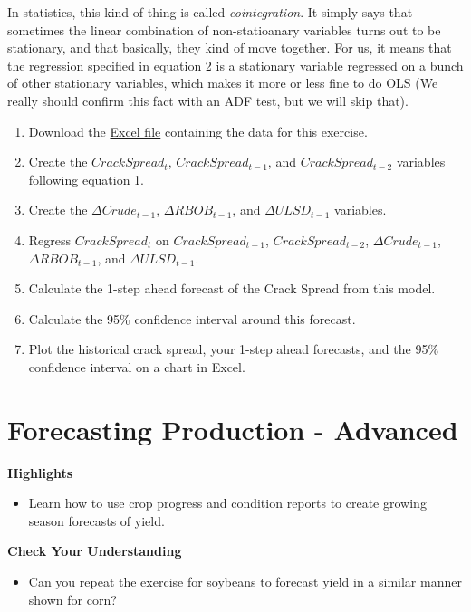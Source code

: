 \documentclass[
]{book}
\providecommand{\tightlist}{%
  \setlength{\itemsep}{0pt}\setlength{\parskip}{0pt}}
\begin{document}
In statistics, this kind of thing is called \emph{cointegration}. It simply says that sometimes the linear combination of non-statioanary variables turns out to be stationary, and that basically, they kind of move together. For us, it means that the regression specified in equation 2 is a stationary variable regressed on a bunch of other stationary variables, which makes it more or less fine to do OLS (We really should confirm this fact with an ADF test, but we will skip that).

\begin{enumerate}
\def\labelenumi{\arabic{enumi}.}
\item
  Download the \href{Excel-files/CrackSpread.csv}{Excel file} containing the data for this exercise.
\item
  Create the \(CrackSpread_t\), \(CrackSpread_{t-1}\), and \(CrackSpread_{t-2}\) variables following equation 1.
\item
  Create the \(\Delta Crude_{t-1}\), \(\Delta RBOB_{t-1}\), and \(\Delta ULSD_{t-1}\) variables.
\item
  Regress \(CrackSpread_t\) on \(CrackSpread_{t-1}\), \(CrackSpread_{t-2}\), \(\Delta Crude_{t-1}\), \(\Delta RBOB_{t-1}\), and \(\Delta ULSD_{t-1}\).
\item
  Calculate the 1-step ahead forecast of the Crack Spread from this model.
\item
  Calculate the 95\% confidence interval around this forecast.
\item
  Plot the historical crack spread, your 1-step ahead forecasts, and the 95\% confidence interval on a chart in Excel.
\end{enumerate}

\hypertarget{forecasting-production---advanced}{%
\chapter{Forecasting Production - Advanced}\label{forecasting-production---advanced}}

\textbf{Highlights}

\begin{itemize}
\tightlist
\item
  Learn how to use crop progress and condition reports to create growing season forecasts of yield.
\end{itemize}

\textbf{Check Your Understanding}

\begin{itemize}
\tightlist
\item
  Can you repeat the exercise for soybeans to forecast yield in a similar manner shown for corn?
\end{itemize}
\end{document}
